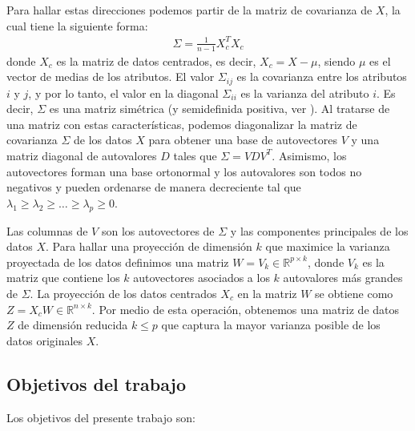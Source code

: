 \documentclass{article}
\begin{document}
Para hallar estas direcciones podemos partir de la matriz de covarianza de $X$, la cual tiene la siguiente forma:
%
\begin{align*}
    \Sigma = \frac{1}{n-1} X_c^T X_c
\end{align*}
%
donde $X_c$ es la matriz de datos centrados, es decir, $X_c = X - \mu$, siendo $\mu$ es el vector de medias de los atributos. El valor $\Sigma_{ij}$ es la covarianza entre los atributos $i$ y $j$, y por lo tanto, el valor en la diagonal $\Sigma_{ii}$ es la varianza del atributo $i$. Es decir, $\Sigma$ es una matriz simétrica (y semidefinida positiva, ver \citealp{bishop2006pattern}). Al tratarse de una matriz con estas características, podemos diagonalizar la matriz de covarianza $\Sigma$ de los datos $X$ para obtener una base de autovectores $V$ y una matriz diagonal de autovalores $D$ tales que $\Sigma = V D V^T$. Asimismo, los autovectores forman una base ortonormal y los autovalores son todos no negativos y pueden ordenarse de manera decreciente tal que $\lambda_1 \geq \lambda_2 \geq \ldots \geq \lambda_p \geq 0$.

Las columnas de $V$ son los autovectores de $\Sigma$ y las componentes principales de los datos $X$. Para hallar una proyección de dimensión $k$ que maximice la varianza proyectada de los datos definimos una matriz $W = V_k \in \mathbb{R}^{p \times k}$, donde $V_k$ es la matriz que contiene los $k$ autovectores asociados a los $k$ autovalores más grandes de $\Sigma$. La proyección de los datos centrados $X_c$ en la matriz $W$ se obtiene como $Z = X_c W \in \mathbb{R}^{n \times k}$. Por medio de esta operación, obtenemos una matriz de datos $Z$ de dimensión reducida $k \leq p$ que captura la mayor varianza posible de los datos originales $X$.


\subsection{Objetivos del trabajo}

Los objetivos del presente trabajo son: 
\end{document}
